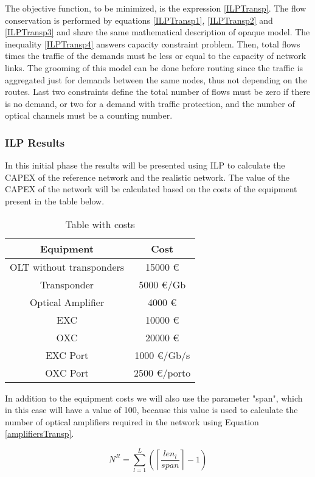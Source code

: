 The objective function, to be minimized, is the expression \ref{ILPTransp}. The flow conservation is performed by equations \ref{ILPTransp1}, \ref{ILPTransp2} and \ref{ILPTransp3} and share the same mathematical description of opaque model. The inequality \ref{ILPTransp4} answers capacity constraint problem. Then, total flows times the traffic of the demands must be less or equal to the capacity of network links. The grooming of this model can be done before routing since the traffic is aggregated just for demands between the same nodes, thus not depending on the routes. Last two constraints define the total number of flows must be zero if there is no demand, or two for a demand with traffic protection, and the number of optical channels must be a counting number.

\subsubsection{ILP Results}

In this initial phase the results will be presented using ILP to calculate the CAPEX of the reference network and the realistic network.
The value of the CAPEX of the network will be calculated based on the costs of the equipment present in the table below.

\begin{table}[h!]
\centering
\begin{tabular}{|| c | c||}
 \hline
 Equipment & Cost \\
 \hline\hline
 OLT without transponders & 15000 \euro \\
 Transponder & 5000 \euro/Gb \\
 Optical Amplifier & 4000 \euro \\
 EXC & 10000 \euro \\
 OXC & 20000 \euro \\
 EXC Port & 1000 \euro /Gb/s\\
 OXC Port & 2500 \euro /porto \\
 \hline
\end{tabular}
\caption{Table with costs}
\label{table_cost2}
\end{table}

In addition to the equipment costs we will also use the parameter "span", which in this case will have a value of 100, because this value is used to calculate the number of optical amplifiers required in the network using Equation \ref{amplifiersTransp}.

\begin{equation}
N^R = \sum\limits_{l=1}^L\left(\left\lceil\frac{len_l}{span}\right\rceil-1\right)
\label{amplifiersTransp}
\end{equation} \\


